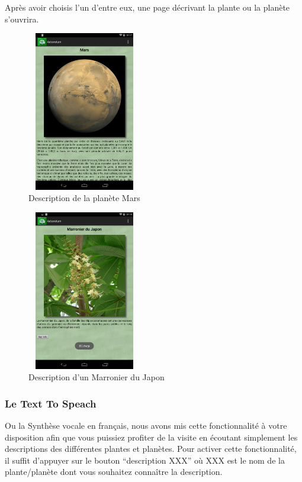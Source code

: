 \documentclass[a4paper,11pt]{article}
\begin{document}
    Après avoir choisis l'un d'entre eux, une page décrivant la plante ou la planète s'ouvrira.
    \begin{figure}[H]
     \begin{center}
      \includegraphics[width=5cm,height=7cm]{mars.png}
    \caption{Description de la planète Mars}
     \end{center}
    \end{figure}
    
    \begin{figure}[H]
     \begin{center}
      \includegraphics[width=5cm,height=7cm]{marronier.png}
    \caption{Description d'un Marronier du Japon}
     \end{center}
    \end{figure}
    
    \subsubsection*{Le Text To Speach}
    Ou la Synthèse vocale en français, nous avons mis cette fonctionnalité à votre disposition afin que vous puissiez profiter de la visite
    en écoutant simplement les descriptions des différentes plantes et planètes. Pour activer cette fonctionnalité, il suffit d'appuyer sur le bouton
    ``description XXX'' où XXX est le nom de la plante/planète dont vous souhaitez connaître la description.
    
\end{document}
